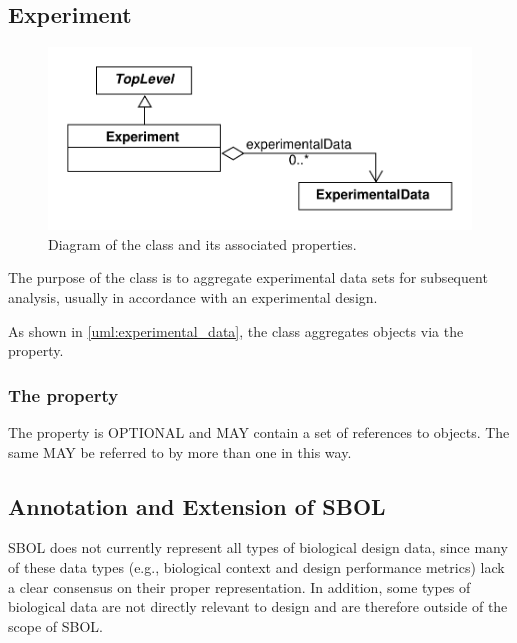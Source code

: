 \subsection{Experiment}
\label{sec:Experiment}


\begin{figure}[ht]
\begin{center}
\includegraphics[scale=0.6]{uml/experiment}
\caption[]{Diagram of the  class and its associated properties.}
\label{uml:experiment}
\end{center}
\end{figure}

The purpose of the  class is to aggregate experimental data sets for subsequent analysis, usually in accordance with an experimental design. 

As shown in \ref{uml:experimental_data}, the  class aggregates  objects via the  property.

\subsubsection*{ The  property}\label{sec:experimentalData}
The  property is OPTIONAL and MAY contain a set of  references to  objects. The same  MAY be referred to by more than one  in this way.

\subsection{Annotation and Extension of SBOL}
\label{sec:Annotations}

SBOL does not currently represent all types of biological design data, since many of these data types (e.g., biological context and design performance metrics) lack a clear consensus on their proper representation. In addition, some types of biological data are not directly relevant to design and are therefore outside of the scope of SBOL.

